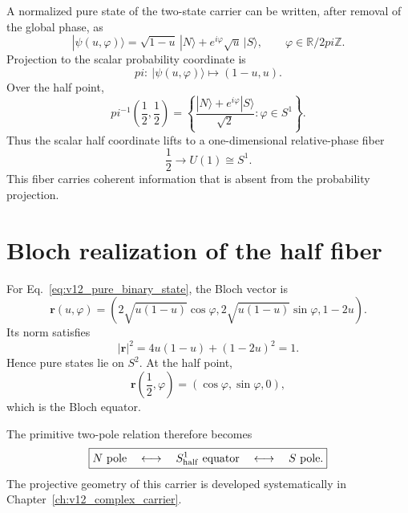 \documentclass[11pt,a4paper,twoside]{book}
\def\pi{pi}%
\theoremstyle{definition}
\begin{document}
A normalized pure state of the two-state carrier can be written, after removal of the global phase, as
\begin{equation}
|\psi(u,\varphi)\rangle
=\sqrt{1-u}\,|N\rangle
+e^{i\varphi}\sqrt{u}\,|S\rangle,
\qquad
\varphi\in\mathbb R/2\pi\mathbb Z.
\label{eq:v12_pure_binary_state}
\end{equation}
Projection to the scalar probability coordinate is
\begin{equation}
\pi:\ |\psi(u,\varphi)\rangle\longmapsto(1-u,u).
\end{equation}
Over the half point,
\begin{equation}
\boxed{
\pi^{-1}\!\left(\frac12,\frac12\right)
=
\left\{
\frac{|N\rangle+e^{i\varphi}|S\rangle}{\sqrt2}
:\varphi\in S^1
\right\}.
}
\label{eq:v12_half_fiber}
\end{equation}
Thus the scalar half coordinate lifts to a one-dimensional relative-phase fiber
\begin{equation}
\boxed{\frac12\longrightarrow U(1)\cong S^1.}
\end{equation}
This fiber carries coherent information that is absent from the probability projection.

\section{Bloch realization of the half fiber}

For Eq.~\eqref{eq:v12_pure_binary_state}, the Bloch vector is
\begin{equation}
\mathbf r(u,\varphi)
=\left(
2\sqrt{u(1-u)}\cos\varphi,
2\sqrt{u(1-u)}\sin\varphi,
1-2u
\right).
\end{equation}
Its norm satisfies
\begin{equation}
|\mathbf r|^2
=4u(1-u)+(1-2u)^2
=1.
\end{equation}
Hence pure states lie on $S^2$. At the half point,
\begin{equation}
\boxed{
\mathbf r\left(\frac12,\varphi\right)
=(\cos\varphi,\sin\varphi,0),
}
\label{eq:v12_half_equator}
\end{equation}
which is the Bloch equator.

The primitive two-pole relation therefore becomes
\begin{equation}
\boxed{
N\text{ pole}
\quad\longleftrightarrow\quad
S^1_{\rm half}\text{ equator}
\quad\longleftrightarrow\quad
S\text{ pole}.
}
\end{equation}
The projective geometry of this carrier is developed systematically in Chapter~\ref{ch:v12_complex_carrier}.
\end{document}
